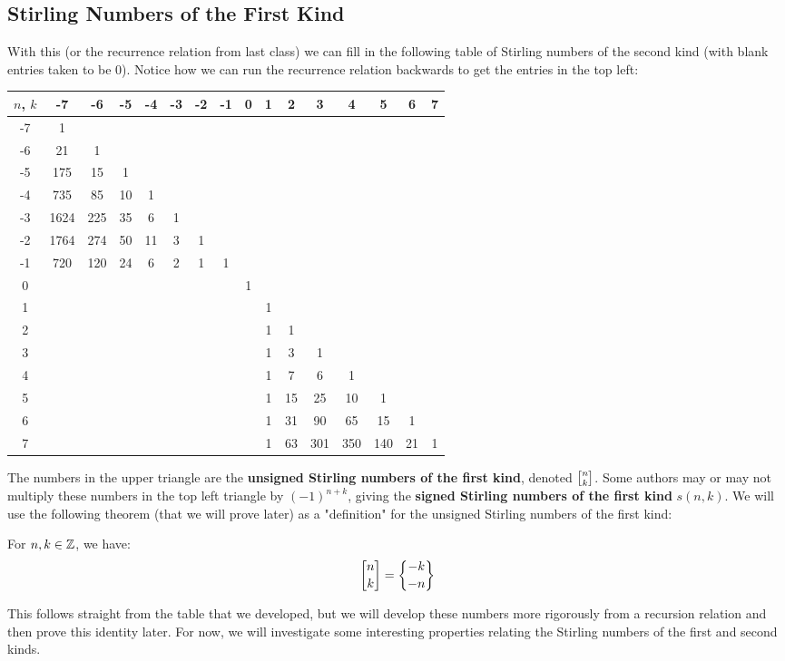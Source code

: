 \subsection{Stirling Numbers of the First Kind}
With this (or the recurrence relation from last class) we can fill in the following table of Stirling numbers of the second kind (with blank entries taken to be 0). Notice how we can run the recurrence relation backwards to get the entries in the top left: 
\begin{center}
\begin{tabular}{c | c c c c c c c c c c c c c c c }
$n$, $k$& -7 & -6 & -5 & -4 & -3 & -2 & -1 & 0 & 1 & 2 & 3 & 4 & 5 & 6 & 7 \\ \hline
-7 & 1 & & & & & & & & & & & & &  & \\ 
-6 & 21 & 1 & & & & & & & & & & & &  & \\
-5 & 175 & 15 & 1 & & & & & & & & & &  & & \\
-4 & 735 & 85 & 10 & 1 & & & & & & & & & & &  \\
-3 & 1624 & 225 & 35 & 6 & 1 & & & & & & & & & & \\
-2 & 1764 & 274 & 50 & 11 & 3 & 1 & & & & & & & & &  \\
-1 & 720 & 120 & 24 & 6 & 2 & 1 & 1 & & & & & & & &  \\
0 & & & & & & & & 1 & & & & & & &  \\ 
1 & & & & & & & & & 1 & & & & & &  \\
2 & & & & & & & & & 1 & 1 & & & & &  \\
3 & & & & & & & & & 1 & 3 & 1 & & & &  \\
4 & & & & & & & & & 1 & 7 & 6 & 1 & & & \\
5 & & & & & & & & & 1 & 15 & 25 & 10 & 1 & &\\
6 & & & & & & & & & 1 & 31 & 90 & 65 & 15 & 1 & \\
7 & & & & & & & & & 1 & 63 & 301 & 350 & 140 & 21 & 1 \\
\end{tabular}
\end{center}

The numbers in the upper triangle are the \textbf{unsigned Stirling numbers of the first kind}, denoted $\stiri{n}{k}$. Some authors may or may not multiply these numbers in the top left triangle by $(-1)^{n+k}$, giving the \textbf{signed Stirling numbers of the first kind} $s(n, k)$. We will use the following theorem (that we will prove later) as a "definition" for the unsigned Stirling numbers of the first kind:
\begin{theorem}
For $n, k \in \mathbb{Z}$, we have:
$$\dstiri{n}{k} = \dstirii{-k}{-n} $$
\end{theorem}
This follows straight from the table that we developed, but we will develop these numbers more rigorously from a recursion relation and then prove this identity later. For now, we will investigate some interesting properties relating the Stirling numbers of the first and second kinds. 

